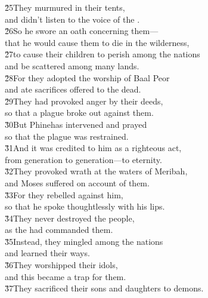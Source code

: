 \begin{poetry}
\poeml \v{25}They murmured in their tents, \\
\poemll    and didn't listen to the voice of the . \\
\poeml \v{26}So he swore an oath concerning them--- \\
\poemll    that he would cause them to die in the wilderness, \\
\poeml \v{27}to cause their children to perish among the nations \\
\poemll    and be scattered among many lands. \\
\poeml \v{28}For they adopted the worship of Baal Peor \\
\poemll    and ate sacrifices offered to the dead. \\
\poeml \v{29}They had provoked anger by their deeds, \\
\poemll    so that a plague broke out against them. \\
\poeml \v{30}But Phinehas intervened and prayed \\
\poemll    so that the plague was restrained. \\
\poeml \v{31}And it was credited to him as a righteous act, \\
\poemll    from generation to generation---to eternity. \\
\poeml \v{32}They provoked wrath at the waters of Meribah, \\
\poemll    and Moses suffered on account of them. \\
\poeml \v{33}For they rebelled against him, \\
\poemll    so that he spoke thoughtlessly with his lips. \\
\poeml \v{34}They never destroyed the people, \\
\poemll    as the  had commanded them. \\
\poeml \v{35}Instead, they mingled among the nations \\
\poemll    and learned their ways. \\
\poeml \v{36}They worshipped their idols, \\
\poemll    and this became a trap for them. \\
\poeml \v{37}They sacrificed their sons and daughters to demons. \\

\end{poetry}
